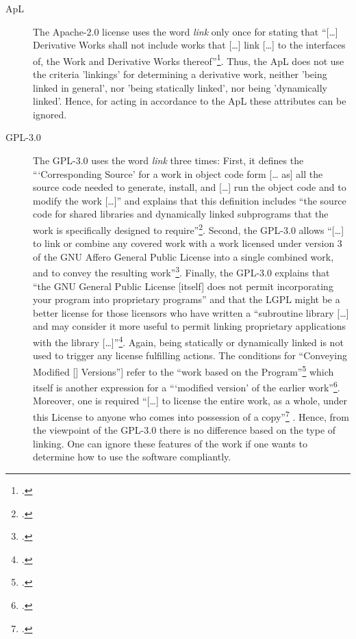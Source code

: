 \begin{description}
  \item[ApL] The Apache-2.0 license uses the word \emph{link} only once for stating
  that \enquote{[\ldots] Derivative Works shall not include works that [\ldots]
  link [\ldots] to the interfaces of, the Work and Derivative Works
  thereof}\footcite [cf.][\nopage wp.\ §0]{Apl20OsiLicense2004a}. Thus, the ApL
  does not use the criteria 'linkings' for determining a derivative work,
  neither 'being linked in general', nor 'being statically linked', nor being
  'dynamically linked'. Hence, for acting in accordance to the ApL these
  attributes can be ignored.
  \item[GPL-3.0] The GPL-3.0 uses the word \emph{link} three times: First, it defines the
  \enquote{\enquote{Corresponding Source} for a work in object code form [\ldots
  as] all the source code needed to generate, install, and [\ldots] run the
  object code and to modify the work [\ldots]} and explains that this definition
  includes \enquote{the source code for shared libraries and dynamically linked
  subprograms that the work is specifically designed to
  require}\footcite[cf.][\nopage wp.\ §0]{Gpl30OsiLicense2007a}. Second, the
  GPL-3.0 allows \enquote{[\ldots] to link or combine any covered work with a
  work licensed under version 3 of the GNU Affero General Public License into a
  single combined work, and to convey the resulting work}\footcite[cf.][\nopage
  wp.\ §13]{Gpl30OsiLicense2007a}. Finally, the GPL-3.0 explains that
  \enquote{the GNU General Public License [itself] does not permit incorporating
  your program into proprietary programs} and that the LGPL might be a better
  license for those licensors who have written a \enquote{subroutine library
  [\ldots] and may consider it more useful to permit linking proprietary
  applications with the library [\ldots]}\footcite[cf.][\nopage wp.\ last
  parapgraph]{Gpl30OsiLicense2007a}. Again, being statically or dynamically
  linked is not used to trigger any license fulfilling actions. The conditions
  for \enquote{Conveying Modified [] Versions}] refer to the \enquote{work based
  on the Program}\footcite[cf.][\nopage wp.\ §5]{Gpl30OsiLicense2007a} which
  itself is another expression for a \enquote{\enquote{modified version} of the
  earlier work}\footcite[cf.][\nopage wp.\ §0]{Gpl30OsiLicense2007a}. Moreover,
  one is required \enquote{[\ldots] to license the entire work, as a whole,
  under this License to anyone who comes into possession of a
  copy}\footcite[cf.][\nopage wp.\ §5]{Gpl30OsiLicense2007a} . Hence, from the
  viewpoint of the GPL-3.0 there is no difference based on the type of linking.
  One can ignore these features of the work if one wants to determine how to use
  the software compliantly.


\end{description}
